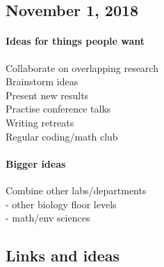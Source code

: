\documentclass[10,portrait]{article}
\let\oldparagraph\paragraph
\renewcommand{\paragraph}[1]{\oldparagraph{#1}\mbox{}}
\begin{document}
\newpage  

\subsection{November 1, 2018}\label{november-1-2018}

\paragraph{Ideas for things people
want}\label{ideas-for-things-people-want}

Collaborate on overlapping research\\
Brainstorm ideas\\
Present new results\\
Practise conference talks\\
Writing retreats\\
Regular coding/math club

\paragraph{Bigger ideas}\label{bigger-ideas}

Combine other labs/departments\\
- other biology floor levels\\
- math/env sciences

\newpage  

\subsection{Links and ideas}\label{links-and-ideas}

\printbibliography
\end{document}

